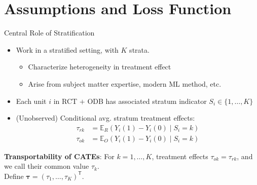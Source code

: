 \documentclass[usenames,dvipsnames]{beamer}
\newcommand{\bstau}{\boldsymbol{\tau}}
\newcommand{\e}{\mathbb{E}}
\newcommand{\tran}{\mathsf{T}}
\theoremstyle{definition} %
\begin{document}

\section{Assumptions and Loss Function}

\begin{frame}{Central Role of Stratification}

\begin{itemize}
\item Work in a stratified setting, with $K$ strata. 
\begin{itemize}
\item Characterize heterogeneity in treatment effect 
\item Arise from subject matter expertise, modern ML method, etc. 
\end{itemize}
\item Each unit $i$ in RCT $+$ ODB has associated stratum indicator $S_i \in \{1, \dots, K\}$
\item (Unobserved) Conditional avg. stratum treatment effects:
\begin{align*}
\tau_{rk} &=  \e_R\left(Y_i(1) - Y_i(0) \mid S_i = k\right)  \\%
\tau_{ok} &=  \e_O\left(Y_i(1) - Y_i(0) \mid S_i = k\right) %
\end{align*}
\end{itemize} \pause
\vspace{5mm}
\color{blue} \textbf{Transportability of CATEs}\color{black}: For $k=1,\dots,K$, treatment effects $\tau_{ok}=\tau_{rk}$, and we call their common value $\tau_k$. \\
Define $\bstau = \left(\tau_1, \dots, \tau_K\right)^\tran$. 
\end{frame}
\end{document}

